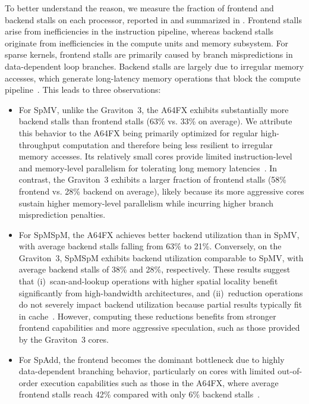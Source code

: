 To better understand the reason, we measure the fraction of frontend and backend stalls on each processor, reported in  and summarized in . Frontend stalls arise from inefficiencies in the instruction pipeline, whereas backend stalls originate from inefficiencies in the compute units and memory subsystem. For sparse kernels, frontend stalls are primarily caused by branch mispredictions in data-dependent loop branches. Backend stalls are largely due to irregular memory accesses, which generate long-latency memory operations that block the compute pipeline~\cite{dongarra2013metric,dongarra2013hpcg,talati2021hpca,talati2022isca}. This leads to three observations:
\begin{itemize}
    \item For SpMV, unlike the Graviton~3, the A64FX exhibits substantially more backend stalls than frontend stalls (63\% vs. 33\% on average). We attribute this behavior to the A64FX being primarily optimized for regular high-throughput computation and therefore being less resilient to irregular memory accesses. Its relatively small cores provide limited instruction-level and memory-level parallelism for tolerating long memory latencies~\cite{esmailidokht2024micro}. In contrast, the Graviton~3 exhibits a larger fraction of frontend stalls (58\% frontend vs. 28\% backend on average), likely because its more aggressive cores sustain higher memory-level parallelism while incurring higher branch misprediction penalties.
    
    \item For SpMSpM, the A64FX achieves better backend utilization than in SpMV, with average backend stalls falling from 63\% to 21\%. Conversely, on the Graviton~3, SpMSpM exhibits backend utilization comparable to SpMV, with average backend stalls of 38\% and 28\%, respectively. These results suggest that (i)~scan-and-lookup operations with higher spatial locality benefit significantly from high-bandwidth architectures, and (ii)~reduction operations do not severely impact backend utilization because partial results typically fit in cache~\cite{nagasaka2018high}. However, computing these reductions benefits from stronger frontend capabilities and more aggressive speculation, such as those provided by the Graviton~3 cores.
    
    \item For SpAdd, the frontend becomes the dominant bottleneck due to highly data-dependent branching behavior, particularly on cores with limited out-of-order execution capabilities such as those in the A64FX, where average frontend stalls reach 42\% compared with only 6\% backend stalls~\cite{hussain2022ipdps}.
\end{itemize}

